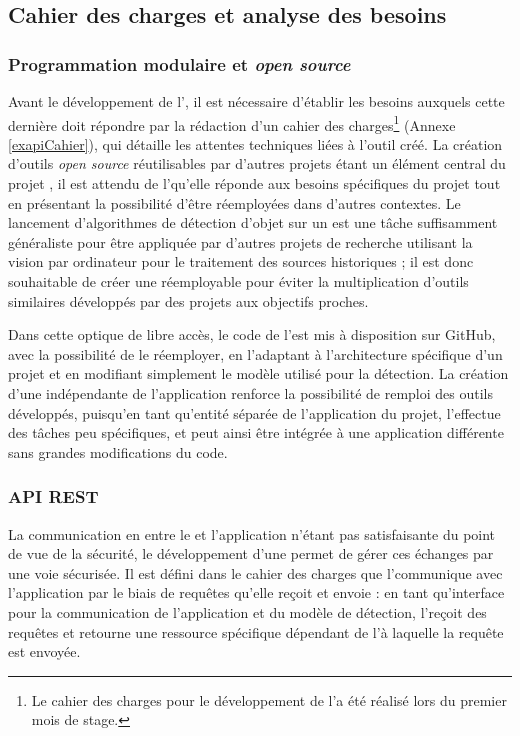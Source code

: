 \subsection{Cahier des charges et analyse des besoins}
    \subsubsection{Programmation modulaire et \textit{open source}}
    Avant le développement de l'\api, il est nécessaire d'établir les besoins auxquels cette dernière doit répondre par la rédaction d'un cahier des charges\footnote{Le cahier des charges pour le développement de l'\api a été réalisé lors du premier mois de stage.} (Annexe \ref{exapiCahier}), qui détaille les attentes techniques liées à l'outil créé. La création d'outils \textit{open source} réutilisables par d'autres projets étant un élément central du projet \eida, il est attendu de l'\api qu'elle réponde aux besoins spécifiques du projet tout en présentant la possibilité d'être réemployées dans d'autres contextes. Le lancement d'algorithmes de détection d'objet sur un \gpu est une tâche suffisamment généraliste pour être appliquée par d'autres projets de recherche utilisant la vision par ordinateur pour le traitement des sources historiques ; il est donc souhaitable de créer une \api réemployable pour éviter la multiplication d'outils similaires développés par des projets aux objectifs proches.
    
    Dans cette optique de libre accès, le code de l'\api est mis à disposition sur GitHub, avec la possibilité de le réemployer, en l'adaptant à l'architecture spécifique d'un projet et en modifiant simplement le modèle utilisé pour la détection. La création d'une \api indépendante de l'application \eida renforce la possibilité de remploi des outils développés, puisqu'en tant qu'entité séparée de l'application du projet, l'\api effectue des tâches peu spécifiques, et peut ainsi être intégrée à une application différente sans grandes modifications du code. 
    
    \subsubsection{API REST}
    La communication en \ssh entre le \gpu et l’application \eida n’étant pas satisfaisante du point de vue de la sécurité, le développement d’une \api permet de gérer ces échanges par une voie sécurisée. Il est défini dans le cahier des charges que l'\api communique avec l'application par le biais de requêtes \http qu'elle reçoit et envoie : en tant qu'interface pour la communication de l'application et du modèle de détection, l'\api reçoit des requêtes \http et retourne une ressource spécifique dépendant de l'\URL à laquelle la requête est envoyée.
    
